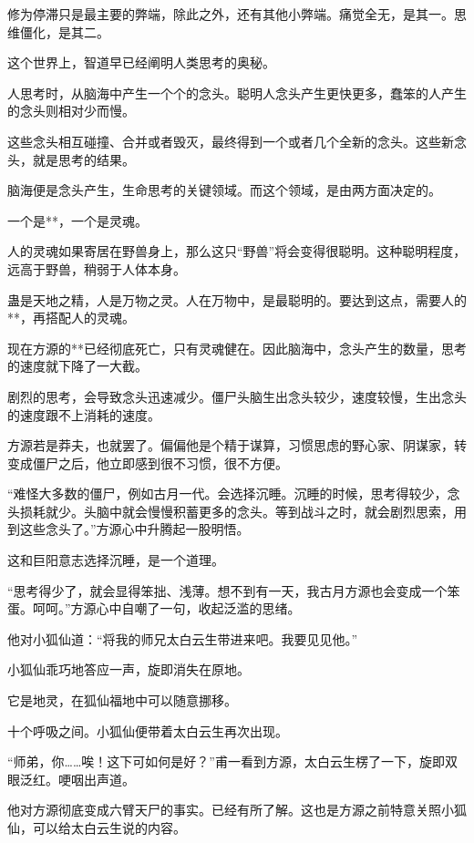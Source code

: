 
\begin{this_body}

修为停滞只是最主要的弊端，除此之外，还有其他小弊端。痛觉全无，是其一。思维僵化，是其二。

这个世界上，智道早已经阐明人类思考的奥秘。

人思考时，从脑海中产生一个个的念头。聪明人念头产生更快更多，蠢笨的人产生的念头则相对少而慢。

这些念头相互碰撞、合并或者毁灭，最终得到一个或者几个全新的念头。这些新念头，就是思考的结果。

脑海便是念头产生，生命思考的关键领域。而这个领域，是由两方面决定的。

一个是**，一个是灵魂。

人的灵魂如果寄居在野兽身上，那么这只“野兽”将会变得很聪明。这种聪明程度，远高于野兽，稍弱于人体本身。

蛊是天地之精，人是万物之灵。人在万物中，是最聪明的。要达到这点，需要人的**，再搭配人的灵魂。

现在方源的**已经彻底死亡，只有灵魂健在。因此脑海中，念头产生的数量，思考的速度就下降了一大截。

剧烈的思考，会导致念头迅速减少。僵尸头脑生出念头较少，速度较慢，生出念头的速度跟不上消耗的速度。

方源若是莽夫，也就罢了。偏偏他是个精于谋算，习惯思虑的野心家、阴谋家，转变成僵尸之后，他立即感到很不习惯，很不方便。

“难怪大多数的僵尸，例如古月一代。会选择沉睡。沉睡的时候，思考得较少，念头损耗就少。头脑中就会慢慢积蓄更多的念头。等到战斗之时，就会剧烈思索，用到这些念头了。”方源心中升腾起一股明悟。

这和巨阳意志选择沉睡，是一个道理。

“思考得少了，就会显得笨拙、浅薄。想不到有一天，我古月方源也会变成一个笨蛋。呵呵。”方源心中自嘲了一句，收起泛滥的思绪。

他对小狐仙道：“将我的师兄太白云生带进来吧。我要见见他。”

小狐仙乖巧地答应一声，旋即消失在原地。

它是地灵，在狐仙福地中可以随意挪移。

十个呼吸之间。小狐仙便带着太白云生再次出现。

“师弟，你……唉！这下可如何是好？”甫一看到方源，太白云生楞了一下，旋即双眼泛红。哽咽出声道。

他对方源彻底变成六臂天尸的事实。已经有所了解。这也是方源之前特意关照小狐仙，可以给太白云生说的内容。


\end{this_body}
